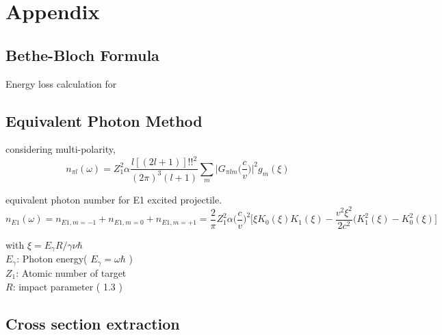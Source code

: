 \renewcommand{\thechapter}{A}
\def\theequation{A.\arabic{section}.\arabic{equation}}
\makeatletter
{}
\makeatother
\chapter*{Appendix}


\section{Bethe-Bloch Formula}
Energy loss calculation for 

\section{Equivalent Photon Method}
considering multi-polarity, 
\begin{displaymath}
    n_{\pi l}(\omega)=Z^{2}_{1} \alpha \frac{l[(2l+1)]!!^{2}}{(2\pi)^{3}(l+1)}\sum_{m}\Big|G_{\pi l m}\big( \frac{c}{v}\big) \Big|^{2} g_{m}(\xi)
\end{displaymath} 

equivalent photon number for E1 excited projectile.
\begin{displaymath}
    n_{E1}(\omega)=n_{E1, m=-1}+n_{E1, m=0}+n_{E1, m=+1}=\frac{2}{\pi}Z^{2}_{1}\alpha\Big(\frac{c}{v}\Big)^{2}\Big[\xi K_{0}(\xi)K_{1}(\xi)-\frac{v^{2}\xi^{2}}{2c^{2}}(K^{2}_{1}(\xi)-K^{2}_{0}(\xi)\Big]
\end{displaymath}

with $\xi=E_{\gamma}R/\gamma \nu \hbar$\\

$E_{\gamma}$: Photon energy( $E_{\gamma}=\omega\hbar$ )\\
$Z_{1}$: Atomic number of target\\
$R$: impact parameter ( 1.3 )\\


\section{Cross section extraction}


